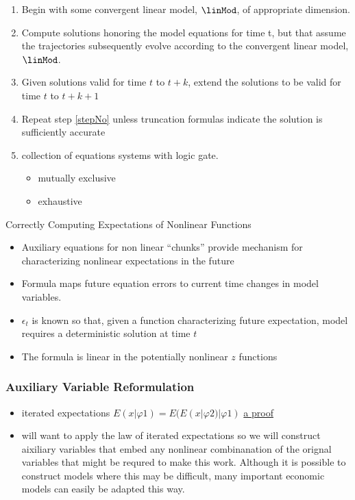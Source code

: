 \documentclass[12pt]{article}
\begin{document}
  \begin{enumerate}
  \item Begin with some convergent linear model, $\linMod$, of appropriate dimension.
  \item Compute solutions honoring the model equations for time t, 
but that assume the trajectories subsequently 
evolve according to the convergent 
linear model, $\linMod$.
  \item Given solutions valid for time $t$ to $t+k$, extend the solutions to be valid for time $t$ to $t+k+1$ \label{stepNo}
\item Repeat step \ref{stepNo} unless truncation formulas indicate the solution is sufficiently accurate
\item collection of equations systems with logic gate.
  \begin{itemize}
  \item mutually exclusive
  \item exhaustive
  \end{itemize}
  \end{enumerate}










  {Correctly Computing Expectations of Nonlinear Functions}

  \begin{itemize}
\item Auxiliary equations for non linear ``chunks'' provide mechanism for characterizing  nonlinear expectations in the future
  \item Formula maps future equation errors  to current time changes in model
variables.
\item  $\epsilon_t$ is known so that,
given a function characterizing future expectation,  model requires
a deterministic solution at time $t$
\item The formula is linear in the potentially nonlinear $z$ functions
  \end{itemize}







\subsubsection{Auxiliary Variable Reformulation}
\label{sec:aux}

\begin{itemize}
\item iterated expectations $E (x | φ1) = E (E (x | φ2) | φ1) $
  \href{https://stats.stackexchange.com/questions/95947/a-generalization-of-the-law-of-iterated-expectations}{a proof}
\item will want to apply the law of iterated expectations so we will construct aixiliary variables that embed any nonlinear combinanation  of the orignal
  variables that might be requred to make this work.  Although it is possible to construct models where this may be difficult, many important economic models
  can easily be adapted this way.

\end{itemize}
\end{document}
